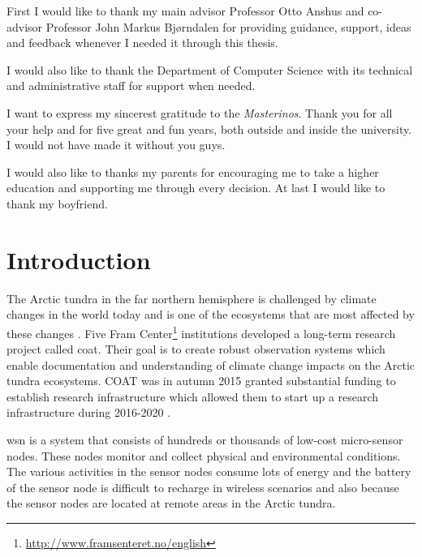 \documentclass[USenglish]{uit-thesis}
\begin{document}
\begin{acknowledgement}
First I would like to thank my main advisor Professor Otto Anshus and co-advisor Professor John Markus Bjørndalen for providing guidance, support, ideas and feedback whenever I needed it through this thesis.

I would also like to thank the Department of Computer Science with its technical and administrative staff for support when needed.

I want to express my sincerest gratitude to the \textit{Masterinos}. Thank you for all your help and for five great and fun years, both outside and inside the university. I would not have made it without you guys.

I would also like to thanks my parents for encouraging me to take a higher education and supporting me through every decision. At last I would like to thank my boyfriend.

\end{acknowledgement}

\tableofcontents


\listoflistings


\printacronyms


\mainmatter

\chapter{Introduction}
\glsresetall
The Arctic tundra in the far northern hemisphere is challenged by climate changes in the world today and is one of the ecosystems that are most affected by these changes \cite{coat2016}. Five Fram Center\footnote{\url{http://www.framsenteret.no/english}} institutions developed a long-term research project called \gls{coat}. Their goal is to create robust observation systems which enable documentation and understanding of climate change impacts on the Arctic tundra ecosystems. COAT was in autumn 2015 granted substantial funding to establish research infrastructure which allowed them to start up a research infrastructure during 2016-2020 \cite{coat2016}.

\gls{wsn} is a system that consists of hundreds or thousands of low-cost micro-sensor nodes. These nodes monitor and collect physical and environmental conditions. The various activities  in the sensor nodes consume lots of energy and the battery of the sensor node is difficult to recharge in wireless scenarios and also because the sensor nodes are located at remote areas in the Arctic tundra.
\end{document}
